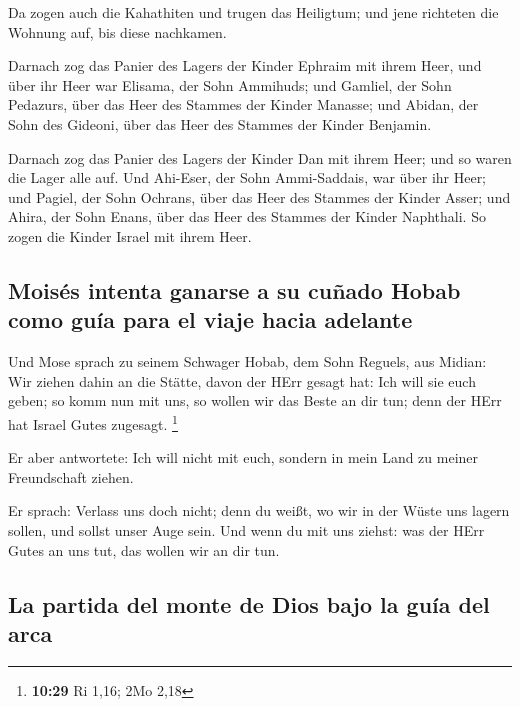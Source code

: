  Da zogen auch die Kahathiten und trugen das Heiligtum;
und jene richteten die Wohnung auf, bis diese nachkamen.

 Darnach zog das Panier des Lagers der Kinder Ephraim mit
ihrem Heer, und über ihr Heer war Elisama, der Sohn Ammihuds;
 und Gamliel, der Sohn Pedazurs, über das Heer des
Stammes der Kinder Manasse;  und Abidan, der Sohn des
Gideoni, über das Heer des Stammes der Kinder Benjamin.

 Darnach zog das Panier des Lagers der Kinder Dan mit
ihrem Heer; und so waren die Lager alle auf. Und Ahi-Eser, der Sohn
Ammi-Saddais, war über ihr Heer;  und Pagiel, der Sohn
Ochrans, über das Heer des Stammes der Kinder Asser;  und
Ahira, der Sohn Enans, über das Heer des Stammes der Kinder Naphthali.
 So zogen die Kinder Israel mit ihrem Heer.

\hypertarget{moisuxe9s-intenta-ganarse-a-su-cuuxf1ado-hobab-como-guuxeda-para-el-viaje-hacia-adelante}{%
\subsection{Moisés intenta ganarse a su cuñado Hobab como guía para el
viaje hacia
adelante}\label{moisuxe9s-intenta-ganarse-a-su-cuuxf1ado-hobab-como-guuxeda-para-el-viaje-hacia-adelante}}

 Und Mose sprach zu seinem Schwager Hobab, dem Sohn
Reguels, aus Midian: Wir ziehen dahin an die Stätte, davon der HErr
gesagt hat: Ich will sie euch geben; so komm nun mit uns, so wollen wir
das Beste an dir tun; denn der HErr hat Israel Gutes zugesagt.
\footnote{\textbf{10:29} Ri 1,16; 2Mo 2,18}

 Er aber antwortete: Ich will nicht mit euch, sondern in
mein Land zu meiner Freundschaft ziehen.

 Er sprach: Verlass uns doch nicht; denn du weißt, wo wir
in der Wüste uns lagern sollen, und sollst unser Auge sein.
 Und wenn du mit uns ziehst: was der HErr Gutes an uns
tut, das wollen wir an dir tun.

\hypertarget{la-partida-del-monte-de-dios-bajo-la-guuxeda-del-arca}{%
\subsection{La partida del monte de Dios bajo la guía del
arca}\label{la-partida-del-monte-de-dios-bajo-la-guuxeda-del-arca}}

